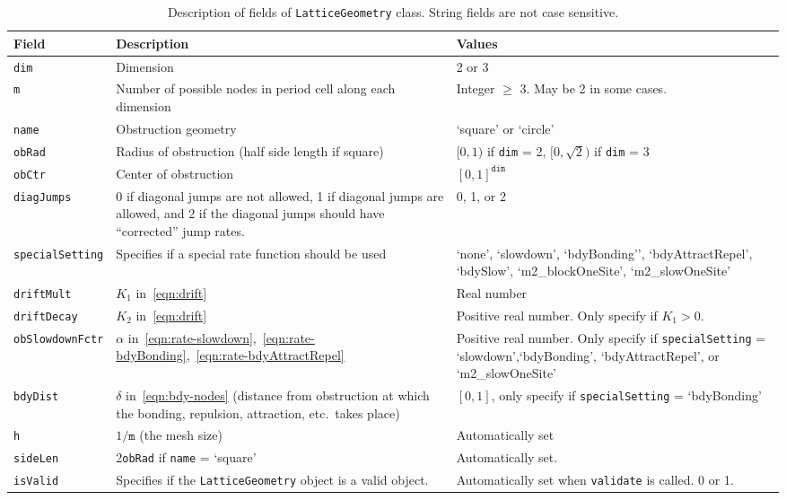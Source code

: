 \documentclass[11pt, oneside]{article}   	%
\theoremstyle{definition}
\begin{document}
\begin{table}
   \centering
   \begin{tabularx}{\linewidth}{lLL} %
      \toprule
      Field     & Description & Values \\
      \midrule
      \texttt{dim}				& Dimension & 2 or 3 \\ \hline
      \texttt{m}				& Number of possible nodes in period cell along each dimension & Integer $\geq$ 3. May be 2 in some cases.\\ \hline
      \texttt{name} 			& Obstruction geometry & `square' or `circle' \\ \hline
      \texttt{obRad}			& Radius of obstruction (half side length if square) & $[0,1)$ if \texttt{dim} = 2, $[0,\sqrt{2})$ if \texttt{dim} = 3 \\ \hline
      \texttt{obCtr}			& Center of obstruction & $[0,1]^{\texttt{dim}}$\\ \hline
      \texttt{diagJumps}		& 0 if diagonal jumps are not allowed, 1 if diagonal jumps are allowed, and 2 if the diagonal jumps should have ``corrected'' jump rates. & 0, 1, or 2 \\ \hline
      \texttt{specialSetting} 	& Specifies if a special rate function should be used & `none', `slowdown', `bdyBonding'', `bdyAttractRepel', `bdySlow', `m2\_blockOneSite', `m2\_slowOneSite' \\ \hline
      \texttt{driftMult}		& $K_1$ in~\eqref{eqn:drift} & Real number \\ \hline
      \texttt{driftDecay}		& $K_2$ in~\eqref{eqn:drift} & Positive real number. Only specify if $K_1 > 0$. \\ \hline
      \texttt{obSlowdownFctr}	& $\alpha$ in~\eqref{eqn:rate-slowdown},~\eqref{eqn:rate-bdyBonding},~\eqref{eqn:rate-bdyAttractRepel} & Positive real number. Only specify if \texttt{specialSetting} = `slowdown',`bdyBonding', `bdyAttractRepel', or `m2\_slowOneSite' \\ \hline
      \texttt{bdyDist}			& $\delta$ in~\eqref{eqn:bdy-nodes} (distance from obstruction at which the bonding, repulsion, attraction, etc.\ takes place) & $[0,1]$, only specify if \texttt{specialSetting} = `bdyBonding' \\ \hline
      \texttt{h}				& $1/\texttt{m}$ (the mesh size) & Automatically set \\ \hline
      \texttt{sideLen}			& 2\texttt{obRad} if \texttt{name} = `square' & Automatically set.\\ \hline
      \texttt{isValid}			& Specifies if the \texttt{LatticeGeometry} object is a valid object. & Automatically set when \texttt{validate} is called. 0 or 1.\\
      \bottomrule
   \end{tabularx}
   \caption{Description of fields of \texttt{LatticeGeometry} class. String fields are not case sensitive.}
   \label{tab:latticegeometry-fields}
\end{table}
\end{document}
